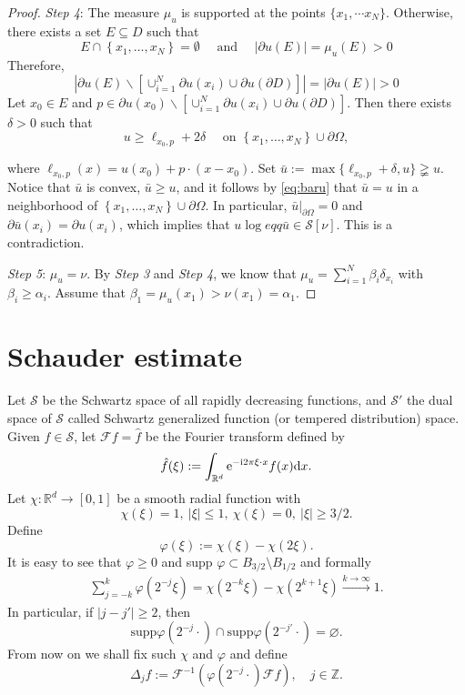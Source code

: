 \documentclass[twoside, 12pt]{book}
\numberwithin{equation}{chapter}
\def\cS{{\mathcal S}}
\def\mR{{\mathbb R}}
\def\mZ{{\mathbb Z}}
\def\sF{{\mathscr F}}
\def\sS{{\mathscr S}}
\def\l{\left}
\def\r{\right}
\def\geq{\geqslant}
\def\leq{\leqslant}
\def\p{\partial}
\def\d{\text{\rm{d}}}
\def\e{\mathrm{e}}
\begin{document}
\begin{proof}
		{\em Step 4}: The measure $\mu_u$ is supported at the points $\{x_1,\cdots x_N\}$. Otherwise, there exists a set $E\subseteq D$ such that
		$$
		E \cap\left\{x_1, \ldots, x_N\right\}=\emptyset \quad \text { and } \quad|\partial u(E)|=\mu_u(E)>0
		$$
		Therefore, 
		$$
		\l|\partial u(E)\backslash [\cup_{i=1}^{N} \p u(x_i)\cup \p u(\p D)]\r|=|\p u (E)|>0 
		$$
		Let $x_0\in E$ and $p\in \p u(x_0)\backslash [\cup_{i=1}^{N} \p u(x_i)\cup \p u(\p D)]$. Then there exists $\delta>0$ such that
		\begin{equation}\label{eq:baru}
			u \geq \ell_{x_0, p}+2 \delta \quad \text { on }\left\{x_1, \ldots, x_N\right\} \cup \partial \Omega, 
		\end{equation}
		
		where $\ell_{x_0, p}(x)=u(x_0)+p\cdot (x-x_0)$. Set $\bar{u}:=\max\{\ell_{x_0, p}+\delta, u\}\gneqq u$. Notice that $\bar{u}$ is convex, $\bar{u} \geqslant u$, and it follows by \eqref{eq:baru} that $\bar{u}=u$ in a neighborhood of $\left\{x_1, \ldots, x_N\right\} \cup \partial \Omega$. In particular, $\left.\bar{u}\right|_{\partial \Omega}=0$ and $\partial \bar{u}\left(x_i\right)=\partial u\left(x_i\right)$, which implies that $u\log eqq\bar u\in \cS[\nu]$. This is a contradiction. 
		
		{\em Step 5}: $\mu_u=\nu$. By {\em Step 3} and {\em Step 4}, we know that $\mu_{u}=\sum_{i=1}^N \beta_i \delta_{x_i}$ with $\beta_i\geq \alpha_i$. Assume that $\beta_1=\mu_u(x_1)>\nu(x_1)=\alpha_1$. 
	\end{proof}
	
	
	
	\section{Schauder estimate}\label{app:Schauder}
	Let $\sS$ be the Schwartz space of all rapidly decreasing functions, and $\sS'$ the dual space of $\sS$ 
	called Schwartz generalized function (or tempered distribution) space. Given $f\in\sS$,
	let $\sF f=\hat f$  be the Fourier transform defined by
	$$
	\hat f(\xi):=\int_{\mR^d}\e^{-\mathrm{i}2\pi\xi\cdot x} f(x)\d x.
	$$
	Let $\chi:\mR^d\to[0,1]$ be a smooth radial function with 
	$$
	\chi(\xi)=1,\ |\xi|\leq 1,\ \chi(\xi)=0,\ |\xi|\geq 3/2.
	$$
	Define
	$$
	\varphi(\xi):=\chi(\xi)-\chi(2\xi).
	$$
	It is easy to see that $\varphi\geq 0$ and supp $\varphi\subset B_{3/2}\setminus B_{1/2}$ and formally 
	\begin{align}\label{EE1}
		\sum_{j=-k}^k\varphi(2^{-j}\xi)=\chi(2^{-k}\xi)-\chi(2^{k+1}\xi)\stackrel{k\to\infty}{\to} 1.
	\end{align}
	In particular, if $|j-j'|\geq 2$, then
	$$
	\mathrm{supp}\varphi(2^{-j}\cdot)\cap\mathrm{supp}\varphi(2^{-j'}\cdot)=\varnothing.
	$$
	From now on we shall fix such $\chi$ and $\varphi$ and define
	$$
	\Delta_j f:=\sF^{-1}(\varphi(2^{-j}\cdot) \sF f), \quad j\in \mZ.
	$$
	
\end{document}
